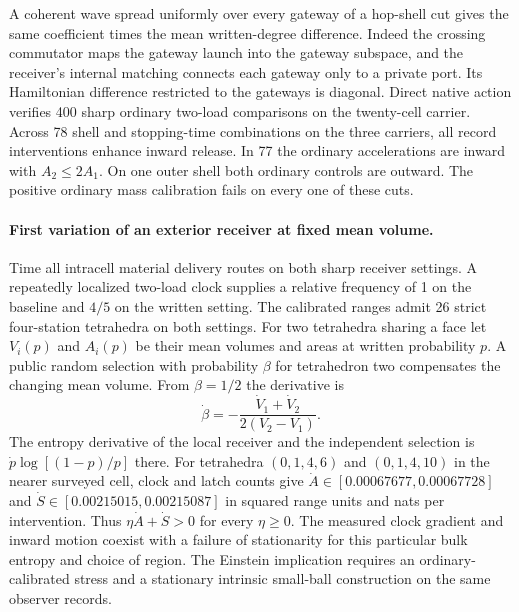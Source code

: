 \documentclass[11pt]{article}
\begin{document}
A coherent wave spread uniformly over every gateway of a hop-shell cut
gives the same coefficient times the mean written-degree difference.
Indeed the crossing commutator maps the gateway launch into the gateway
subspace, and the receiver's internal matching connects each gateway
only to a private port. Its Hamiltonian difference restricted to the
gateways is diagonal. Direct native action verifies 400 sharp ordinary
two-load comparisons on the twenty-cell carrier. Across 78 shell and
stopping-time combinations on the three carriers, all record interventions
enhance inward release. In 77 the ordinary accelerations are inward with
$A_2\le2A_1$. On one outer shell both ordinary controls are outward.
The positive ordinary mass calibration fails on every one of these cuts.

\paragraph{First variation of an exterior receiver at fixed mean volume.}
Time all intracell material delivery routes on both sharp receiver settings.
A repeatedly localized two-load clock supplies a relative frequency of 1
on the baseline and $4/5$ on the written setting. The calibrated ranges
admit 26 strict four-station tetrahedra on both settings. For two
tetrahedra sharing a face let $V_i(p)$ and $A_i(p)$ be their mean volumes
and areas at written probability $p$. A public random selection with
probability $\beta$ for tetrahedron two compensates the changing mean
volume. From $\beta=1/2$ the derivative is
\[
 \dot\beta=-\frac{\dot V_1+\dot V_2}{2(V_2-V_1)}.
\]
The entropy derivative of the local receiver and the independent selection
is $\dot p\log[(1-p)/p]$ there. For tetrahedra $(0,1,4,6)$ and
$(0,1,4,10)$ in the nearer surveyed cell, clock and latch counts give
$\dot A\in[0.00067677,0.00067728]$ and
$\dot S\in[0.00215015,0.00215087]$ in squared range units and nats
per intervention. Thus $\eta\dot A+\dot S>0$ for every $\eta\ge0$.
The measured clock gradient and inward motion coexist with a failure
of stationarity for this particular bulk entropy and choice of region.
The Einstein implication requires an ordinary-calibrated stress and a
stationary intrinsic small-ball construction on the same observer records.
\end{document}
